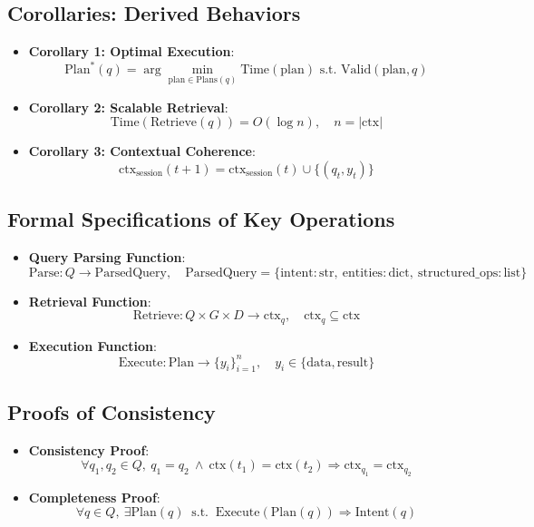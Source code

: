 \documentclass[11pt]{article}
\begin{document}
\subsection{Corollaries: Derived Behaviors}
\label{subsec:corollaries}

\begin{itemize}
    \item \textbf{Corollary 1: Optimal Execution}:
    \[
    \text{Plan}^*(q) = \arg\min_{\text{plan} \in \text{Plans}(q)} \text{Time}(\text{plan}) \text{ s.t. } \text{Valid}(\text{plan}, q)
    \]

    \item \textbf{Corollary 2: Scalable Retrieval}:
    \[
    \text{Time}(\text{Retrieve}(q)) = O(\log n),\quad n = |\text{ctx}|
    \]

    \item \textbf{Corollary 3: Contextual Coherence}:
    \[
    \text{ctx}_{\text{session}}(t+1) = \text{ctx}_{\text{session}}(t) \cup \{ (q_t, y_t) \}
    \]
\end{itemize}

\subsection{Formal Specifications of Key Operations}
\label{subsec:formal_specs}

\begin{itemize}
    \item \textbf{Query Parsing Function}:
    \[
    \text{Parse}: Q \rightarrow \text{ParsedQuery},\quad \text{ParsedQuery} = \{ \text{intent}: \text{str},\ \text{entities}: \text{dict},\ \text{structured\_ops}: \text{list} \}
    \]

    \item \textbf{Retrieval Function}:
    \[
    \text{Retrieve}: Q \times G \times D \rightarrow \text{ctx}_q,\quad \text{ctx}_q \subseteq \text{ctx}
    \]

    \item \textbf{Execution Function}:
    \[
    \text{Execute}: \text{Plan} \rightarrow \{ y_i \}_{i=1}^n,\quad y_i \in \{ \text{data}, \text{result} \}
    \]
\end{itemize}

\subsection{Proofs of Consistency}
\label{subsec:proofs}

\begin{itemize}
    \item \textbf{Consistency Proof}:
    \[
    \forall q_1, q_2 \in Q,\ q_1 = q_2\ \wedge\ \text{ctx}(t_1) = \text{ctx}(t_2) \Rightarrow \text{ctx}_{q_1} = \text{ctx}_{q_2}
    \]

    \item \textbf{Completeness Proof}:
    \[
    \forall q \in Q,\ \exists \text{Plan}(q)\ \text{ s.t. }\ \text{Execute}(\text{Plan}(q)) \Rightarrow \text{Intent}(q)
    \]
\end{itemize}
\end{document}
